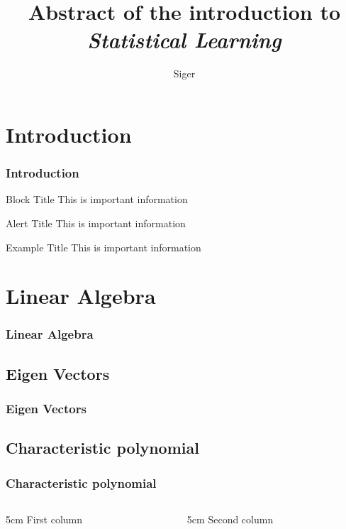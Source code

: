 \documentclass[10pt]{beamer}
\title{Abstract of the introduction to \emph{Statistical Learning}}
\author{Siger}
\begin{document}
\maketitle




\section{Introduction}
\begin{frame}
    \frametitle{Introduction}

    \begin{block}{Block Title}
        This is important information
    \end{block}

    \begin{alertblock}{Alert Title}
        This is important information
    \end{alertblock}

    \begin{exampleblock}{Example Title}
        This is important information
    \end{exampleblock}
    
\end{frame}


\section{Linear Algebra}
\begin{frame}
    \frametitle{Linear Algebra}
\end{frame}

\subsection{Eigen Vectors}
\begin{frame}
    \frametitle{Eigen Vectors}
\end{frame}


\subsection{Characteristic polynomial}
\begin{frame}
    \frametitle{Characteristic polynomial}
    \begin{columns}[T] %
        \begin{column}{5cm}
            First column
        \end{column}
        \begin{column}{5cm}
            Second column
        \end{column}
    \end{columns}
\end{frame}
\end{document}
